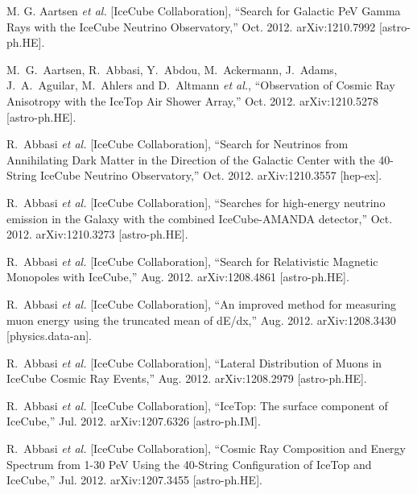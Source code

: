\begin{enumerate}

  M. G. Aartsen {\it et al.}  [IceCube Collaboration],
  ``Search for Galactic PeV Gamma Rays with the IceCube Neutrino Observatory,'' Oct. 2012.
  arXiv:1210.7992 [astro-ph.HE].

  M.~G.~Aartsen, R.~Abbasi, Y.~Abdou, M.~Ackermann, J.~Adams, J.~A.~Aguilar, M.~Ahlers and D.~Altmann {\it et al.},
  ``Observation of Cosmic Ray Anisotropy with the IceTop Air Shower Array,'' Oct. 2012.
  arXiv:1210.5278 [astro-ph.HE].

  R.~Abbasi {\it et al.}  [IceCube Collaboration],
  ``Search for Neutrinos from Annihilating Dark Matter in the Direction of the Galactic Center with the 40-String IceCube Neutrino Observatory,'' Oct. 2012.
  arXiv:1210.3557 [hep-ex].

  R.~Abbasi {\it et al.}  [IceCube Collaboration],
  ``Searches for high-energy neutrino emission in the Galaxy with the combined IceCube-AMANDA detector,'' Oct. 2012.
  arXiv:1210.3273 [astro-ph.HE].

  R.~Abbasi {\it et al.}  [IceCube Collaboration],
  ``Search for Relativistic Magnetic Monopoles with IceCube,'' Aug. 2012.
  arXiv:1208.4861 [astro-ph.HE].

  R.~Abbasi {\it et al.}  [IceCube Collaboration],
  ``An improved method for measuring muon energy using the truncated mean of dE/dx,'' Aug. 2012.
  arXiv:1208.3430 [physics.data-an].

  R.~Abbasi {\it et al.}  [IceCube Collaboration],
  ``Lateral Distribution of Muons in IceCube Cosmic Ray Events,'' Aug. 2012.
  arXiv:1208.2979 [astro-ph.HE].

  R.~Abbasi {\it et al.}  [IceCube Collaboration],
  ``IceTop: The surface component of IceCube,'' Jul. 2012.
  arXiv:1207.6326 [astro-ph.IM].

  R.~Abbasi {\it et al.}  [IceCube Collaboration],
  ``Cosmic Ray Composition and Energy Spectrum from 1-30 PeV Using the 40-String Configuration of IceTop and IceCube,'' Jul. 2012.
  arXiv:1207.3455 [astro-ph.HE].

\end{enumerate}


